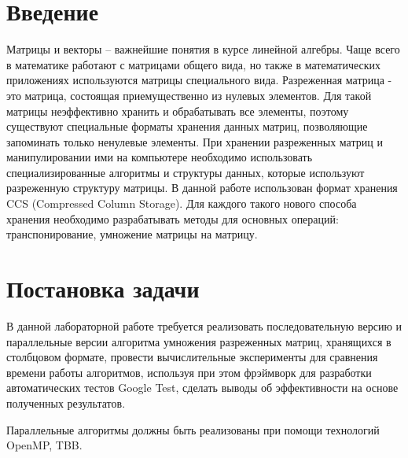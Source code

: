 \documentclass{report}
\begin{document}
\setcounter{page}{2}

\tableofcontents
\newpage

\section*{Введение}
\par Матрицы и векторы – важнейшие понятия в курсе линейной алгебры. Чаще всего в математике работают с матрицами общего вида, но также в математических приложениях используются матрицы специального вида. Разреженная матрица - это матрица, состоящая приемущественно из нулевых элементов. Для такой матрицы неэффективно хранить и обрабатывать все элементы, поэтому существуют специальные форматы хранения данных матриц, позволяющие запоминать только ненулевые элементы. При хранении разреженных матриц и манипулировании ими на компьютере необходимо использовать специализированные алгоритмы и структуры данных, которые используют разреженную структуру матрицы. В данной работе использован формат хранения  CCS (Compressed Column Storage). Для каждого такого нового способа хранения необходимо разрабатывать методы для основных операций: транспонирование, умножение матрицы на матрицу.
\newpage

\section*{Постановка задачи}
\par В данной лабораторной работе требуется реализовать последовательную версию и параллельные версии алгоритма  умножения разреженных матриц, хранящихся в столбцовом формате, провести вычислительные эксперименты для сравнения времени работы алгоритмов, используя при этом фрэймворк для разработки автоматических тестов Google Test, сделать выводы об эффективности на основе полученных результатов.
\par Параллельные алгоритмы должны быть реализованы при помощи технологий OpenMP, TBB.
\newpage

\end{document}

